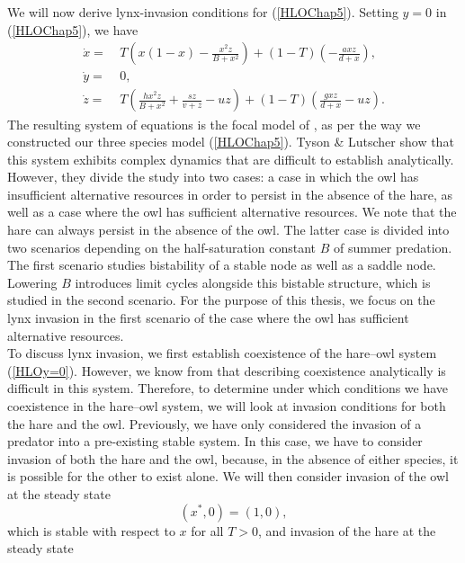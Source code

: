 \documentclass[12pt]{UOthesis}
\theoremstyle{remarkstyle}
\begin{document}
We will now derive lynx-invasion conditions for (\ref{HLOChap5}). Setting $y=0$ in (\ref{HLOChap5}), we have
\begin{equation}
	\begin{split}
		\dot{x}=&\ T\left(x(1-x)-\frac{x^2z}{B+x^2}\right)+(1-T)\left(-\frac{axz}{d+x}\right),\\
		\dot{y}=&\ 0,\\
		\dot{z}=&\ T\left(\frac{hx^2z}{B+x^2}+\frac{sz}{v+z}-uz\right)+(1-T)\left(\frac{gxz}{d+x}-uz\right).
	\end{split}
	\label{HLOy=0}
\end{equation}
The resulting system of equations is the focal model of \cite{TysonLutscher}, as per the way we constructed our three species model (\ref{HLOChap5}). Tyson \& Lutscher show that this system exhibits complex dynamics that are difficult to establish analytically. However, they divide the study into two cases: a case in which the owl has insufficient alternative resources in order to persist in the absence of the hare, as well as a case where the owl has sufficient alternative resources. We note that the hare can always persist in the absence of the owl. The latter case is divided into two scenarios depending on the half-saturation constant $B$ of summer predation. The first scenario studies bistability of a stable node as well as a saddle node. Lowering $B$ introduces limit cycles alongside this bistable structure, which is studied in the second scenario. For the purpose of this thesis, we focus on the lynx invasion in the first scenario of the case where the owl has sufficient alternative resources.\\

To discuss lynx invasion, we first establish coexistence of the hare--owl system (\ref{HLOy=0}). However, we know from \cite{TysonLutscher} that describing coexistence analytically is difficult in this system. Therefore, to determine under which conditions we have coexistence in the hare--owl system, we will look at invasion conditions for both the hare and the owl. Previously, we have only considered the invasion of a predator into a pre-existing stable system. In this case, we have to consider invasion of both the hare and the owl, because, in the absence of either species, it is possible for the other to exist alone. We will then consider invasion of the owl at the steady state
\begin{equation}
	(x^*,0)=(1,0),
	\label{HLOy=0HareOnlyState}
\end{equation}
which is stable with respect to $x$ for all $T>0$, and invasion of the hare at the steady state
\end{document}
